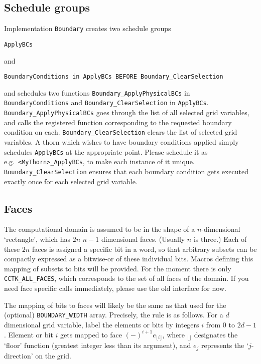 \documentclass{article}
\begin{document}
\subsection{Schedule groups}
\label{Boundary/sec:schedule_groups}

Implementation \texttt{Boundary} creates two schedule groups
\begin{verbatim}
ApplyBCs
\end{verbatim}
and
\begin{verbatim}
BoundaryConditions in ApplyBCs BEFORE Boundary_ClearSelection
\end{verbatim}
and schedules two functions \texttt{Boundary\_ApplyPhysicalBCs} in
\texttt{BoundaryConditions} and \texttt{Boundary\_ClearSelection} in
\texttt{ApplyBCs}.  \texttt{Boundary\_ApplyPhysicalBCs} goes through
the list of all selected grid variables, and calls the registered
function corresponding to the requested boundary condition on each.
\texttt{Boundary\_ClearSelection} clears the list of selected grid
variables.  A thorn which wishes to have boundary conditions applied
simply schedules \texttt{ApplyBCs} at the appropriate point.  Please
schedule it as e.g.~\verb|<MyThorn>_ApplyBCs|, to make each instance
of it unique.
\texttt{Boundary\_ClearSelection} ensures that each boundary condition
gets executed exactly once for each selected grid variable.


\subsection{Faces}
\label{Boundary/sec:faces}

The computational domain is assumed to be in the shape of a
$n$-dimensional `rectangle', which has $2n$ $n-1$ dimensional faces.  (Usually $n$
is three.)  Each of these $2n$ faces is assigned a specific bit in a
word, so that arbitrary subsets can be compactly expressed as a
bitwise-or of these individual bits.  Macros defining this mapping of
subsets to bits will be provided.
For the moment there is only
\texttt{CCTK\_ALL\_FACES}, which corresponds to the set of all faces
of the domain.  If you need face specific calls immediately, please
use the old interface for now.  

The mapping of bits to faces will likely be the same as that used for
the (optional) \texttt{BOUNDARY\_WIDTH} array.  Precisely, the rule is as
follows.  For a $d$ dimensional grid variable, label the elements or
bits by integers $i$ from $0$ to $2d-1$. Element or bit $i$ gets
mapped to face $(-)^{i+1}e_{\lfloor i\rfloor}$, where ${}_{\lfloor
\rfloor}$ designates the `floor' function (greatest integer less than
its argument), and $e_j$ represents the `$j$-direction' on the grid.
\end{document}

